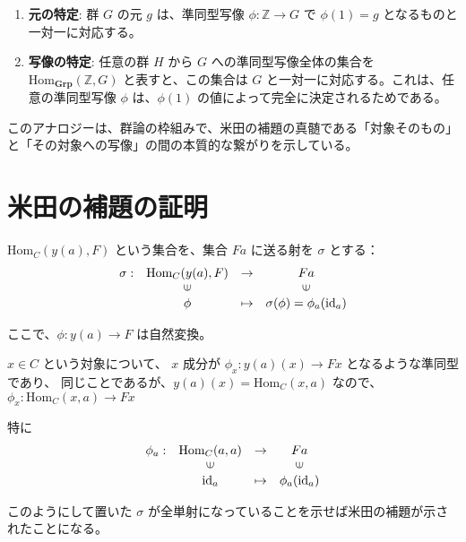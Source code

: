 \documentclass[uplatex,a4j,12pt,dvipdfmx]{jsarticle}
\begin{document}
\begin{enumerate}
	\item \textbf{元の特定}: 群 $G$ の元 $g$ は、準同型写像 $\phi: \mathbb{Z} \to G$ で $\phi(1) = g$ となるものと一対一に対応する。
	\item \textbf{写像の特定}: 任意の群 $H$ から $G$ への準同型写像全体の集合を $\text{Hom}_{\mathbf{Grp}}(\mathbb{Z}, G)$ と表すと、この集合は $G$ と一対一に対応する。これは、任意の準同型写像 $\phi$ は、$\phi(1)$ の値によって完全に決定されるためである。
\end{enumerate}

このアナロジーは、群論の枠組みで、米田の補題の真髄である「対象そのもの」と「その対象への写像」の間の本質的な繋がりを示している。









\section{米田の補題の証明}

$\text{Hom}_{C}(y(a),F)$ という集合を、集合 $Fa$ に送る射を $\sigma$ とする：
\[
	\begin{array}{cccc}
		\sigma : & \text{Hom}_{C}(y(a),F)  & \to     & Fa                                     \\
		         & \rotatebox{90}{${\in}$} &         & \rotatebox{90}{${\in}$}                \\
		         & \phi                    & \mapsto & \sigma(\phi) = \phi_{a}(\text{id}_{a})
	\end{array}
\]

ここで、$\phi: y(a) \to F$ は自然変換。

$x \in C$ という対象について、 $x$ 成分が $\phi_{x} : y(a)(x) \to Fx$ となるような準同型であり、
同じことであるが、$y(a)(x)=\text{Hom}_{C}(x,a)$ なので、 $\phi_{x} : \text{Hom}_{C}(x,a) \to Fx$

特に
\[
	\begin{array}{cccc}
		\phi_{a} : & \text{Hom}_{C}(a,a)     & \to     & Fa                      \\
		           & \rotatebox{90}{${\in}$} &         & \rotatebox{90}{${\in}$} \\
		           & \text{id}_{a}           & \mapsto & \phi_{a}(\text{id}_{a})
	\end{array}
\]

このようにして置いた $\sigma$ が全単射になっていることを示せば米田の補題が示されたことになる。
\end{document}
